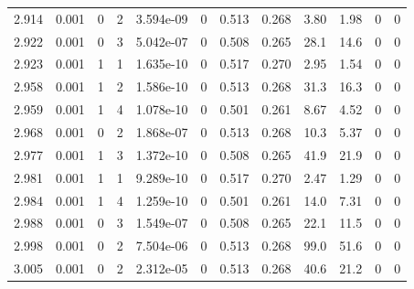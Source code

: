 \documentclass[preview]{standalone}
\begin{document}
{{{{{{{\begin{tabular}{L{1.2cm}C{1.2cm} C{0.3cm}C{0.5cm} C{1.4cm}C{1.4cm} C{1.4cm}C{1.4cm} C{1.6cm}C{1.6cm} C{1.6cm}C{1.6cm}}
  2.914  &  0.001  & 0     &  2 &  3.594e-09  & 0  &  0.513&   0.268& 3.80 & 1.98   &  0 & 0  \\ 
  2.922  &  0.001  & 0     &  3 &  5.042e-07  & 0  &  0.508&   0.265& 28.1 & 14.6   &  0 & 0  \\ 
  2.923  &  0.001  & 1     &  1 &  1.635e-10  & 0  &  0.517&   0.270& 2.95 & 1.54   &  0 & 0  \\ 
  2.958  &  0.001  & 1     &  2 &  1.586e-10  & 0  &  0.513&   0.268& 31.3 & 16.3   &  0 & 0  \\ 
  2.959  &  0.001  & 1     &  4 &  1.078e-10  & 0  &  0.501&   0.261& 8.67 & 4.52   &  0 & 0  \\ 
  2.968  &  0.001  & 0     &  2 &  1.868e-07  & 0  &  0.513&   0.268& 10.3 & 5.37   &  0 & 0  \\ 
  2.977  &  0.001  & 1     &  3 &  1.372e-10  & 0  &  0.508&   0.265& 41.9 & 21.9   &  0 & 0  \\ 
  2.981  &  0.001  & 1     &  1 &  9.289e-10  & 0  &  0.517&   0.270& 2.47 & 1.29   &  0 & 0  \\ 
  2.984  &  0.001  & 1     &  4 &  1.259e-10  & 0  &  0.501&   0.261& 14.0 & 7.31   &  0 & 0  \\ 
  2.988  &  0.001  & 0     &  3 &  1.549e-07  & 0  &  0.508&   0.265& 22.1 & 11.5   &  0 & 0  \\ 
  2.998  &  0.001  & 0     &  2 &  7.504e-06  & 0  &  0.513&   0.268& 99.0 & 51.6   &  0 & 0  \\ 
  3.005  &  0.001  & 0     &  2 &  2.312e-05  & 0  &  0.513&   0.268& 40.6 & 21.2   &  0 & 0  \\ 
\hline 
\end{tabular} 

}}}}}}}
\end{document}
